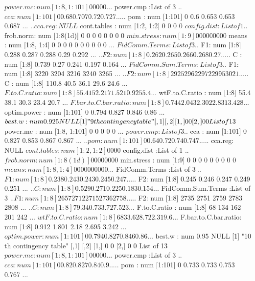 \documentclass[11pt]{article} %
\begin{document}
\begin{Schunk}
\begin{Soutput}
 $ power.mc            : num [1:8, 1:101] 0 0 0 0 0 ...
 $ power.cmp           :List of 3
  ..$ cca    : num [1:101] 0 0.68 0.707 0.72 0.727 ...
  ..$ pom    : num [1:101] 0 0.6 0.653 0.653 0.687 ...
  ..$ cca.reg: NULL
 $ cont.tables         : num [1:2, 1:2] 0 0 0 0
 $ config.dist         :List of 1
  ..$ frob.norm: num [1:8(1d)] 0 0 0 0 0 0 0 0
 $ min.stress          : num [1:9] 0 0 0 0 0 0 0 0 0
 $ means               : num [1:8, 1:4] 0 0 0 0 0 0 0 0 0 0 ...
 $ FidComm.Terms       :List of 3
  ..$ F1: num [1:8] 0.288 0.287 0.288 0.29 0.292 ...
  ..$ F2: num [1:8] 0.262 0.265 0.266 0.268 0.27 ...
  ..$ C : num [1:8] 0.739 0.27 0.241 0.197 0.164 ...
 $ FidComm.Sum.Terms   :List of 3
  ..$ F1: num [1:8] 3220 3204 3216 3240 3265 ...
  ..$ F2: num [1:8] 2925 2962 2972 2995 3021 ...
  ..$ C : num [1:8] 110.8 40.5 36.1 29.6 24.6 ...
 $ F.to.C.ratio        : num [1:8] 55.4 152.2 171.5 210.9 255.4 ...
 $ wtF.to.C.ratio      : num [1:8] 55.4 38.1 30.3 23.4 20.7 ...
 $ F.bar.to.C.bar.ratio: num [1:8] 0.744 2.043 2.302 2.831 3.428 ...
 $ optim.power         : num [1:101] 0 0.794 0.827 0.846 0.86 ...
 $ best.w              : num 0.925
NULL
[1] "9 th contingency table"
     [,1] [,2]
[1,]    0    0
[2,]    0    0
List of 13
 $ power.mc            : num [1:8, 1:101] 0 0 0 0 0 ...
 $ power.cmp           :List of 3
  ..$ cca    : num [1:101] 0 0.827 0.853 0.867 0.867 ...
  ..$ pom    : num [1:101] 0 0.64 0.72 0.74 0.747 ...
  ..$ cca.reg: NULL
 $ cont.tables         : num [1:2, 1:2] 0 0 0 0
 $ config.dist         :List of 1
  ..$ frob.norm: num [1:8(1d)] 0 0 0 0 0 0 0 0
 $ min.stress          : num [1:9] 0 0 0 0 0 0 0 0 0
 $ means               : num [1:8, 1:4] 0 0 0 0 0 0 0 0 0 0 ...
 $ FidComm.Terms       :List of 3
  ..$ F1: num [1:8] 0.238 0.243 0.243 0.245 0.247 ...
  ..$ F2: num [1:8] 0.245 0.246 0.247 0.249 0.251 ...
  ..$ C : num [1:8] 0.529 0.271 0.225 0.183 0.154 ...
 $ FidComm.Sum.Terms   :List of 3
  ..$ F1: num [1:8] 2657 2712 2715 2736 2758 ...
  ..$ F2: num [1:8] 2735 2751 2759 2783 2808 ...
  ..$ C : num [1:8] 79.3 40.7 33.7 27.5 23 ...
 $ F.to.C.ratio        : num [1:8] 68 134 162 201 242 ...
 $ wtF.to.C.ratio      : num [1:8] 68 33.6 28.7 22.3 19.6 ...
 $ F.bar.to.C.bar.ratio: num [1:8] 0.912 1.801 2.18 2.695 3.242 ...
 $ optim.power         : num [1:101] 0 0.794 0.827 0.846 0.86 ...
 $ best.w              : num 0.95
NULL
[1] "10 th contingency table"
     [,1] [,2]
[1,]    0    0
[2,]    0    0
List of 13
 $ power.mc            : num [1:8, 1:101] 0 0 0 0 0 ...
 $ power.cmp           :List of 3
  ..$ cca    : num [1:101] 0 0.82 0.827 0.84 0.9 ...
  ..$ pom    : num [1:101] 0 0.733 0.733 0.753 0.767 ...

\end{Soutput}
\end{Schunk}
\end{document}
